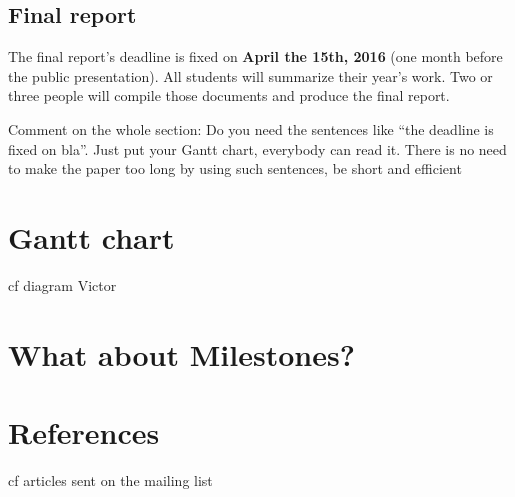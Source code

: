 \documentclass[11pt,a4paper]{article}
\newcommand{\red}[1]{{\color{red} #1}}
\begin{document}
\subsection{Final report}

The final report's deadline is fixed on \textbf{April the 15th, 2016} (one month before the public presentation). All students will summarize their year's work. Two or three people will compile those documents and produce the final report.

\red{Comment on the whole section: Do you need the sentences like ``the deadline is fixed on bla''. Just put your Gantt chart, everybody can read it. There is no need to make the paper too long by using such sentences, be short and efficient}

\section{Gantt chart}

cf diagram Victor

\red{\section{What about Milestones?}}

\section{References}
\label{section:references}

cf articles sent on the mailing list
\end{document}
